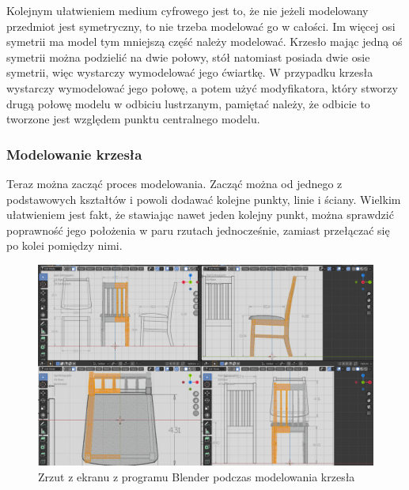 \documentclass{article} %
\begin{document}
            Kolejnym ułatwieniem medium cyfrowego jest to, że nie jeżeli modelowany przedmiot jest symetryczny, to nie trzeba modelować go w całości. Im więcej osi symetrii ma model tym mniejszą część należy modelować. Krzesło mając jedną oś symetrii można podzielić na dwie połowy, stół natomiast posiada dwie osie symetrii, więc wystarczy wymodelować jego ćwiartkę. W przypadku krzesła wystarczy wymodelować jego połowę, a potem użyć modyfikatora, który stworzy drugą połowę modelu w odbiciu lustrzanym, pamiętać należy, że odbicie to tworzone jest względem punktu centralnego modelu.
            \\
            
            \subsubsection*{Modelowanie krzesła}
            Teraz można zacząć proces modelowania. Zacząć można od jednego z podstawowych kształtów i powoli dodawać kolejne punkty, linie i ściany. Wielkim ułatwieniem jest fakt, że stawiając nawet jeden kolejny punkt, można sprawdzić poprawność jego położenia w paru rzutach jednocześnie, zamiast przełączać się po kolei pomiędzy nimi.
            \\
            
            \begin{figure}[h]
            \centering
            \includegraphics[bb=0 0 1580 948,scale=0.28,keepaspectratio=true]{images/screenshots/work/5-modelowanie-mebli_004.png}
            \caption{Zrzut z ekranu z programu Blender podczas modelowania krzesła}
            \end{figure}
\end{document}
